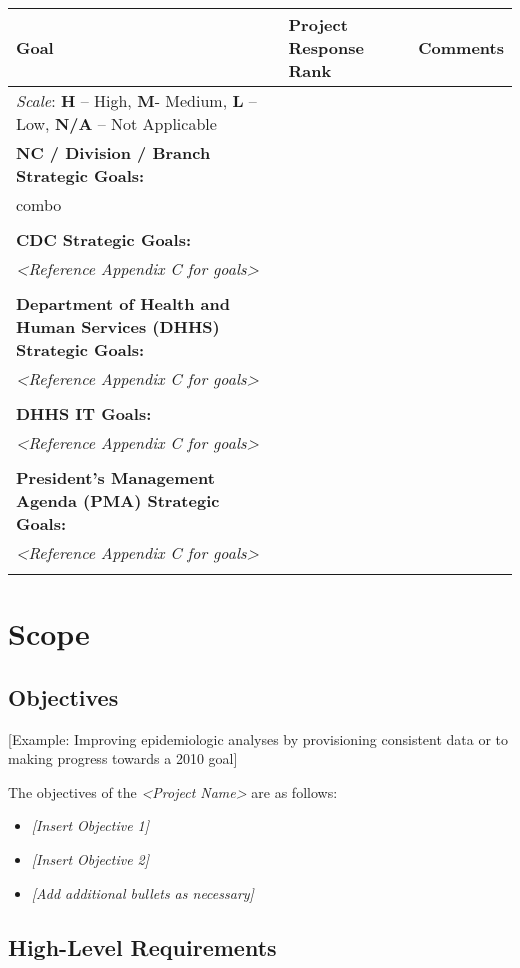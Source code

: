 \documentclass[a4paper, 11pt]{article}
\begin{document}
\begin{longtable}[]{@{}lll@{}}
\toprule
\textbf{Goal} & \textbf{Project Response Rank} &
\textbf{Comments}\tabularnewline
\midrule
\endhead
\emph{Scale}: \textbf{H} -- High, \textbf{M}- Medium, \textbf{L} -- Low,
\textbf{N/A} -- Not Applicable & &\tabularnewline
\textbf{NC / Division / Branch Strategic Goals:} & &\tabularnewline
combo & &\tabularnewline
& &\tabularnewline
\textbf{CDC Strategic Goals:} & &\tabularnewline
\emph{\textless{}Reference Appendix C for goals\textgreater{}} &
&\tabularnewline
& &\tabularnewline
\textbf{Department of Health and Human Services (DHHS) Strategic Goals:
} & &\tabularnewline
\emph{\textless{}Reference Appendix C for goals\textgreater{}} &
&\tabularnewline
& &\tabularnewline
\textbf{DHHS IT Goals:} & &\tabularnewline
\emph{\textless{}Reference Appendix C for goals\textgreater{}} &
&\tabularnewline
& &\tabularnewline
\textbf{President's Management Agenda (PMA) Strategic Goals:} &
&\tabularnewline
\emph{\textless{}Reference Appendix C for goals\textgreater{}} &
&\tabularnewline
& &\tabularnewline
\bottomrule
\end{longtable}

\hypertarget{scope}{%
\section{Scope}\label{scope}}

\hypertarget{objectives}{%
\subsection{Objectives}\label{objectives}}

{[}Example: Improving epidemiologic analyses by provisioning consistent
data or to making progress towards a 2010 goal{]}

The objectives of the \emph{\textless{}Project Name\textgreater{}} are
as follows:

\begin{itemize}
\item
  \emph{{[}Insert Objective 1{]}}
\item
  \emph{{[}Insert Objective 2{]}}
\item
  \emph{{[}Add additional bullets as necessary{]}}
\end{itemize}

\hypertarget{high-level-requirements}{%
\subsection{High-Level Requirements}\label{high-level-requirements}}
\end{document}
